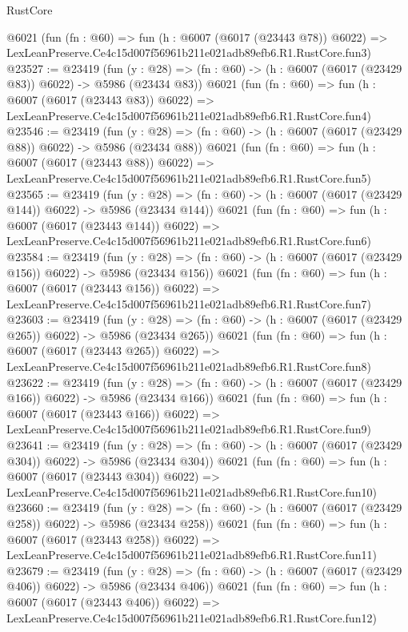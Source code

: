 \begin{lexlean}{RustCore}
\begin{coremodule}
    @6021
    (fun (fn : @60) =>
    fun (h : @6007 (@6017 (@23443 @78)) @6022) =>
    LexLeanPreserve.Ce4c15d007f56961b211e021adb89efb6.R1.RustCore.fun3)
@23527 := @23419
    (fun (y : @28) => (fn : @60) -> (h : @6007 (@6017 (@23429 @83)) @6022) -> @5986 (@23434 @83))
    @6021
    (fun (fn : @60) =>
    fun (h : @6007 (@6017 (@23443 @83)) @6022) =>
    LexLeanPreserve.Ce4c15d007f56961b211e021adb89efb6.R1.RustCore.fun4)
@23546 := @23419
    (fun (y : @28) => (fn : @60) -> (h : @6007 (@6017 (@23429 @88)) @6022) -> @5986 (@23434 @88))
    @6021
    (fun (fn : @60) =>
    fun (h : @6007 (@6017 (@23443 @88)) @6022) =>
    LexLeanPreserve.Ce4c15d007f56961b211e021adb89efb6.R1.RustCore.fun5)
@23565 := @23419
    (fun (y : @28) => (fn : @60) -> (h : @6007 (@6017 (@23429 @144)) @6022) -> @5986 (@23434 @144))
    @6021
    (fun (fn : @60) =>
    fun (h : @6007 (@6017 (@23443 @144)) @6022) =>
    LexLeanPreserve.Ce4c15d007f56961b211e021adb89efb6.R1.RustCore.fun6)
@23584 := @23419
    (fun (y : @28) => (fn : @60) -> (h : @6007 (@6017 (@23429 @156)) @6022) -> @5986 (@23434 @156))
    @6021
    (fun (fn : @60) =>
    fun (h : @6007 (@6017 (@23443 @156)) @6022) =>
    LexLeanPreserve.Ce4c15d007f56961b211e021adb89efb6.R1.RustCore.fun7)
@23603 := @23419
    (fun (y : @28) => (fn : @60) -> (h : @6007 (@6017 (@23429 @265)) @6022) -> @5986 (@23434 @265))
    @6021
    (fun (fn : @60) =>
    fun (h : @6007 (@6017 (@23443 @265)) @6022) =>
    LexLeanPreserve.Ce4c15d007f56961b211e021adb89efb6.R1.RustCore.fun8)
@23622 := @23419
    (fun (y : @28) => (fn : @60) -> (h : @6007 (@6017 (@23429 @166)) @6022) -> @5986 (@23434 @166))
    @6021
    (fun (fn : @60) =>
    fun (h : @6007 (@6017 (@23443 @166)) @6022) =>
    LexLeanPreserve.Ce4c15d007f56961b211e021adb89efb6.R1.RustCore.fun9)
@23641 := @23419
    (fun (y : @28) => (fn : @60) -> (h : @6007 (@6017 (@23429 @304)) @6022) -> @5986 (@23434 @304))
    @6021
    (fun (fn : @60) =>
    fun (h : @6007 (@6017 (@23443 @304)) @6022) =>
    LexLeanPreserve.Ce4c15d007f56961b211e021adb89efb6.R1.RustCore.fun10)
@23660 := @23419
    (fun (y : @28) => (fn : @60) -> (h : @6007 (@6017 (@23429 @258)) @6022) -> @5986 (@23434 @258))
    @6021
    (fun (fn : @60) =>
    fun (h : @6007 (@6017 (@23443 @258)) @6022) =>
    LexLeanPreserve.Ce4c15d007f56961b211e021adb89efb6.R1.RustCore.fun11)
@23679 := @23419
    (fun (y : @28) => (fn : @60) -> (h : @6007 (@6017 (@23429 @406)) @6022) -> @5986 (@23434 @406))
    @6021
    (fun (fn : @60) =>
    fun (h : @6007 (@6017 (@23443 @406)) @6022) =>
    LexLeanPreserve.Ce4c15d007f56961b211e021adb89efb6.R1.RustCore.fun12)

\end{coremodule}
\end{lexlean}
